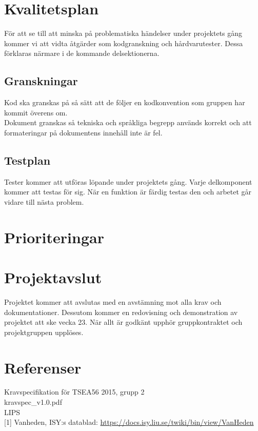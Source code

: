 \documentclass[11pt]{article}
\begin{document}
\begin{flushleft}
\pagebreak

\section{Kvalitetsplan}
För att se till att minska på problematiska händelser under projektets gång kommer vi att vidta åtgärder som kodgranskning och hårdvarutester. Dessa förklaras närmare i de kommande delsektionerna.

\subsection{Granskningar}
Kod ska granskas på så sätt att de följer en kodkonvention som gruppen har kommit överens om.\\
Dokument granskas så tekniska och språkliga begrepp används korrekt och att formateringar på dokumentens innehåll inte är fel.

\subsection{Testplan}
Tester kommer att utföras löpande under projektets gång. Varje delkomponent kommer att testas för sig. När en funktion är färdig testas den och arbetet går vidare till nästa problem.

\pagebreak

\section{Prioriteringar}


\pagebreak

\section{Projektavslut}
Projektet kommer att avslutas med en avstämning mot alla krav och dokumentationer. Dessutom kommer en redovisning och demonstration av projektet att ske vecka 23. När allt är godkänt upphör gruppkontraktet och projektgruppen upplöses.
\\[0.1in]



\setcounter{secnumdepth}{0}
\pagebreak
\section{Referenser}
Kravspecifikation för TSEA56 2015, grupp 2\\
kravspec\_v1.0.pdf \\[0.1in]

LIPS \\[0.1in]

[1] Vanheden, ISY:s datablad: \url{https://docs.isy.liu.se/twiki/bin/view/VanHeden}

\setcounter{secnumdepth}{2}


\end{flushleft}
\end{document}
